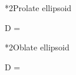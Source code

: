 \documentclass[\mainfilename]{subfiles}
\begin{document}
\begin{sectionBox}
    \begin{sectionBox}*2{Prolate ellipsoid} %
        \begin{BM}
            D
            = 
        \end{BM}
    \end{sectionBox}

    \begin{sectionBox}*2{Oblate ellipsoid} %
        \begin{BM}
            D
            = 
        \end{BM}
    \end{sectionBox}

\end{sectionBox}


\end{document}
